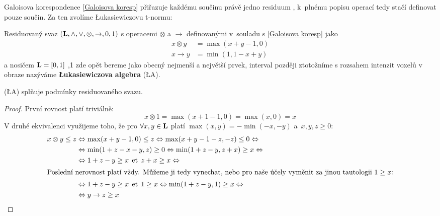     Galoisova korespondence \eqref{Galoisova koresp} přiřazuje každému součinu právě jedno residuum \cite{MajerovaPhD}, k~plnému popisu operací tedy stačí definovat pouze součin. Za ten zvolíme \L ukasiewiczovu t-normu:

    \begin{define}\label{LA}
    Residuovaný svaz $(\mathbf{L},\wedge,\vee,\otimes,\rightarrow,0,1)$ s operacemi $\otimes$ a $\rightarrow$ definovanými v~souladu s \eqref{Galoisova koresp} jako
    \begin{align}
    x \otimes y &= \max(x+y-1,0) \\
    x \rightarrow y &= \min(1,1-x+y)
    \end{align}
    a nosičem $\mathbf{L} = [0,1]$ ,1 zde opět bereme jako obecný nejmenší a největší prvek, interval později ztotožníme s rozsahem intenzit voxelů v obraze\rr {} nazýváme \textbf{\L ukasiewiczova algebra} \textup{(\L A)}.
    \end{define}

    \begin{theo}
      \textup{(\L A)} splňuje podmínky residuovaného svazu.
    \end{theo}
    \begin{proof}
    První rovnost platí triviálně:
      \[
      x \otimes 1 = \max(x+1-1,0) = \max(x,0) = x
      \]
    V druhé ekvivalenci využijeme toho, že pro $\forall x,y \in \mathbf{L}$ platí $\max(x,y) = -\min(-x,-y)$ a~$x,y,z \geq 0$:
    \begin{align*}
      x \otimes y \leq z &\Leftrightarrow \max(x+y-1,0) \leq z \Leftrightarrow \max(x+y-1-z,-z) \leq 0 \Leftrightarrow\\
      &\Leftrightarrow \min(1+z-x-y,z) \geq 0 \Leftrightarrow \min(1+z-y,z+x) \geq x \Leftrightarrow\\
      &\Leftrightarrow 1+z-y \geq x \;\,\mathrm{et}\;\, z+x \geq x \Leftrightarrow\\
    \intertext{Poslední nerovnost platí vždy. Můžeme ji tedy vynechat, nebo pro naše účely vyměnit za jinou tautologii $1 \geq x$:}
      &\Leftrightarrow 1+z-y \geq x \;\,\mathrm{et}\;\, 1 \geq x \Leftrightarrow \min(1+z-y,1) \geq x \Leftrightarrow\\
      &\Leftrightarrow y \rightarrow z \geq x
    \end{align*}
    \end{proof}


